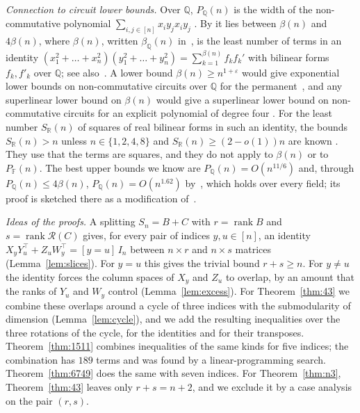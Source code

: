 \documentclass[11pt]{amsart}
\theoremstyle{remark}
\newcommand{\F}{\mathbb{F}}
\newcommand{\Q}{\mathbb{Q}}
\newcommand{\rk}{\operatorname{rank}}
\newcommand{\R}{\mathcal{R}}
\begin{document}
\emph{Connection to circuit lower bounds.} Over $\Q$, $P_\Q(n)$ is the width of the non-commutative
polynomial $\sum_{i,j\in[n]}x_iy_jx_iy_j$ \cite[Lemma~3.5]{HWY11}. By \cite[Proposition~4.1]{HWY11} it lies
between $\beta(n)$ and $4\beta(n)$, where $\beta(n)$, written $\beta_\Q(n)$ in~\cite{Hru24}, is the least
number of terms in an identity $(x_1^2+\dots+x_n^2)(y_1^2+\dots+y_n^2)=\sum_{k=1}^{\beta(n)}f_kf_k'$ with
bilinear forms $f_k,f'_k$ over $\Q$; see also~\cite[Appendix~G]{Cla26}. A lower bound
$\beta(n)\ge n^{1+\varepsilon}$ would give exponential lower bounds on non-commutative circuits over $\Q$ for
the permanent~\cite[Theorem~1.8]{HWY11}, and any superlinear lower bound on $\beta(n)$ would give a
superlinear lower bound on non-commutative circuits for an explicit polynomial of degree four
\cite[Theorem~1.7]{HWY11}. For the least number $S_{\mathbb R}(n)$ of squares of real bilinear forms in such
an identity, the bounds $S_{\mathbb R}(n)>n$ unless $n\in\{1,2,4,8\}$ and $S_{\mathbb R}(n)\ge(2-o(1))n$ are
known \cite[Theorems~1.1 and~1.2]{HWY11}. They use that the terms are squares, and they do not apply to
$\beta(n)$ or to $P_\F(n)$. The best upper bounds we know are $P_\Q(n)=O(n^{11/6})$
\cite[Appendix~G]{Cla26} and, through $P_\Q(n)\le4\beta(n)$, $P_\Q(n)=O(n^{1.62})$
by~\cite[Theorem~12]{Hru24}, which holds over every field; its proof is sketched there as a modification
of~\cite[Theorem~1]{Hru24}.

\emph{Ideas of the proofs.} A splitting $S_n=B+C$ with $r=\rk B$ and $s=\rk\R(C)$ gives, for every pair of
indices $y,u\in[n]$, an identity $X_yY_u^{\top}+Z_uW_y^{\top}=[y=u]\,I_n$ between $n\times r$ and $n\times s$
matrices (Lemma~\ref{lem:slices}). For $y=u$ this gives the trivial bound $r+s\ge n$. For $y\ne u$ the
identity forces the column spaces of $X_y$ and $Z_u$ to overlap, by an amount that the ranks of $Y_u$ and
$W_y$ control (Lemma~\ref{lem:excess}). For Theorem~\ref{thm:43} we combine these overlaps around a cycle of
three indices with the submodularity of dimension (Lemma~\ref{lem:cycle}), and we add the resulting
inequalities over the three rotations of the cycle, for the identities and for their transposes.
Theorem~\ref{thm:1511} combines inequalities of the same kinds for five indices; the combination has $189$
terms and was found by a linear-programming search. Theorem~\ref{thm:6749} does the same with seven
indices. For Theorem~\ref{thm:n3}, Theorem~\ref{thm:43} leaves only $r+s=n+2$, and we exclude it by a case analysis on
the pair $(r,s)$.
\end{document}

